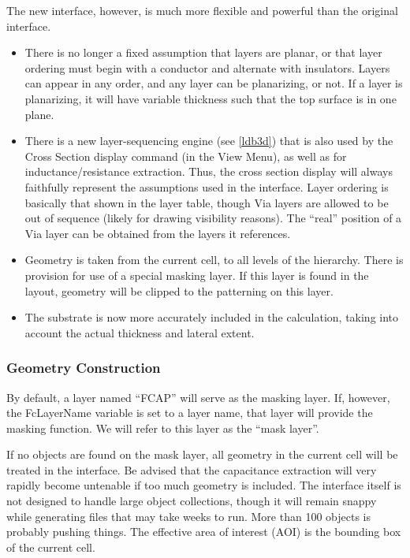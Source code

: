 The new interface, however, is much more flexible and powerful
than the original interface.

\begin{itemize}
\item{There is no longer a fixed assumption that layers are planar, or
that layer ordering must begin with a conductor and alternate with
insulators.  Layers can appear in any order, and any layer can be
planarizing, or not.  If a layer is planarizing, it will have variable
thickness such that the top surface is in one plane.}

\item{There is a new layer-sequencing engine (see \ref{ldb3d}) that is
also used by the {\cb Cross Section} display command (in the {\cb View
Menu}), as well as for inductance/resistance extraction.  Thus, the
cross section display will always faithfully represent the assumptions
used in the interface.  Layer ordering is basically that shown in the
layer table, though {\et Via} layers are allowed to be out of sequence
(likely for drawing visibility reasons).  The ``real'' position of a
{\et Via} layer can be obtained from the layers it references.}

\item{Geometry is taken from the current cell, to all levels of the
hierarchy.  There is provision for use of a special masking layer.  If
this layer is found in the layout, geometry will be clipped to the
patterning on this layer.}

\item{The substrate is now more accurately included in the
calculation, taking into account the actual thickness and lateral
extent.}
\end{itemize}

\subsubsection{Geometry Construction}
\label{subsaoi}

By default, a layer named ``{\vt FCAP}'' will serve as the masking
layer.  If, however, the {\et FcLayerName} variable is set to a
layer name, that layer will provide the masking function.  We will
refer to this layer as the ``mask layer''.

If no objects are found on the mask layer, all geometry in the current
cell will be treated in the interface.  Be advised that the
capacitance extraction will very rapidly become untenable if too much
geometry is included.  The interface itself is not designed to handle
large object collections, though it will remain snappy while
generating files that may take weeks to run.  More than 100 objects is
probably pushing things.  The effective area of interest (AOI) is the
bounding box of the current cell.


